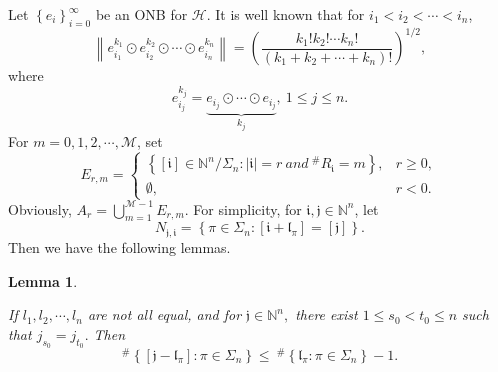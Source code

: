 \documentclass[11pt]{article}
\theoremstyle{plain}
\newtheorem{lem}[thm]{Lemma}
\theoremstyle{definition}
\begin{document}
Let $\left \{ e _{i}  \right \} _{i=0}^{\infty } $ be an ONB for $\mathcal{H}$. It is well known that for $i_1<i_2<\cdots<i_n$,
$$
\left\|e^{k_{1}} _{i_1} \odot e_{i_2}^{k_{2}} \odot \cdots \odot e^{k_{n}}_{i_n}\right\|=\left(\frac{k_{1}!k_{2}!\cdots k_{n}!}{\left ( k_{1}+  k_{2}+\cdots+k_{n} \right )! }\right)^{1 / 2},
$$
where $$e^{k_{j}} _{i_j} = \underbrace{e _{i_j}\odot \cdots \odot e _{i_j} }_{k_{j}}, \ 1 \le j \le n.$$
For $m=0,1,2,\cdots ,\mathscr{M}$, set
\begin{equation}\label{eq8}
	E_{r,m} = \begin{cases}
	\left \{ [\mathfrak{i}]\in\mathbb N^n/\Sigma_n: \left | \mathfrak{i}  \right |=r \ and \   ^{\#  } R_{\mathfrak{i}  }  =m   \right \},& r \geq 0, \\
	\emptyset,& r < 0.
\end{cases}
\end{equation}
Obviously, $A_r=\bigcup\limits_{m=1}^{\mathscr{M}-1}E_{r,m}$.
For  simplicity, for $\mathfrak{i},\mathfrak{j}\in \mathbb N^n$, let
\begin{equation}\label{eq11}
		N_{\mathfrak{j}, \mathfrak{i}  }=\left \{ \pi\in\Sigma_{n}:[\mathfrak{i}+\mathfrak{l}_\pi]= [\mathfrak{j}] \right \}.
	\end{equation}
Then we have the following lemmas.
\begin{lem}\label{lem530}

	If $l_{1},l_{2},\cdots,l_{n}$  are not all equal, and for $\mathfrak{j}\in \mathbb N^n,$ there exist $1 \le s_0 < t_0 \le n$ such that $j_{s_0}=j_{t_0}.$ Then \begin{equation}\label{eq1001}^{\#  }\left \{[\mathfrak{j}-\mathfrak{l}_{\pi}]:\pi \in \Sigma_{n} \right \}
	\le \ ^{\#  }\left \{ \mathfrak{l}_{\pi} :\pi \in \Sigma_{n} \right \}  - 1.\end{equation}
\end{lem}
\end{document}
